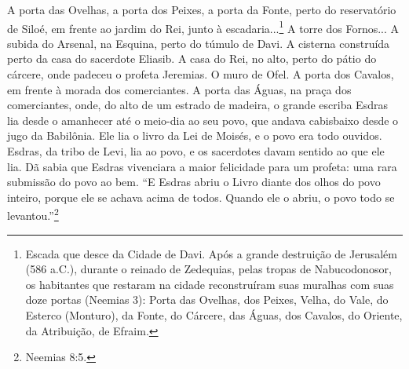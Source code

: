 A porta das Ovelhas, a porta dos Peixes, a porta da Fonte, perto do
reservatório de Siloé, em frente ao jardim do Rei, junto à
escadaria...\footnote{Escada que desce da Cidade de Davi. Após a grande
  destruição de Jerusalém (586 a.C.), durante o reinado de Zedequias,
  pelas tropas de Nabucodonosor, os habitantes que restaram na cidade
  reconstruíram suas muralhas com suas doze portas (Neemias 3): Porta
  das Ovelhas, dos Peixes, Velha, do Vale, do Esterco (Monturo), da
  Fonte, do Cárcere, das Águas, dos Cavalos, do Oriente, da Atribuição,
  de Efraim.} A torre dos Fornos... A subida do Arsenal, na Esquina,
perto do túmulo de Davi. A cisterna construída perto da casa do
sacerdote Eliasib. A casa do Rei, no alto, perto do pátio do cárcere,
onde padeceu o profeta Jeremias. O muro de Ofel. A porta dos Cavalos, em
frente à morada dos comerciantes. A porta das Águas, na praça dos
comerciantes, onde, do alto de um estrado de madeira, o grande escriba
Esdras lia desde o amanhecer até o meio-dia ao seu povo, que andava
cabisbaixo desde o jugo da Babilônia. Ele lia o livro da Lei de Moisés,
e o povo era todo ouvidos. Esdras, da tribo de Levi, lia ao povo, e os
sacerdotes davam sentido ao que ele lia. Dã sabia que Esdras vivenciara
a maior felicidade para um profeta: uma rara submissão do povo ao bem.
``E Esdras abriu o Livro diante dos olhos do povo inteiro, porque ele se
achava acima de todos. Quando ele o abriu, o povo todo se
levantou.''\footnote{Neemias 8:5.}

